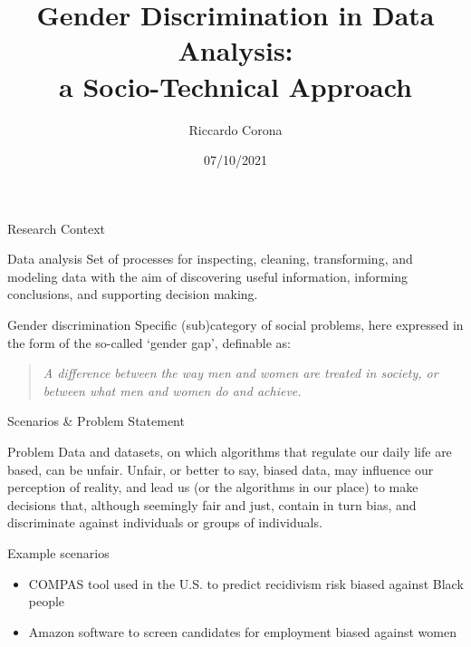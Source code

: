 \documentclass[usenames,dvipsnames]{beamer}
\title{Gender Discrimination in Data Analysis:\\a Socio-Technical Approach}
\author{Riccardo Corona}
\date{07/10/2021}
\begin{document}
    \begin{frame}
        \maketitle
    \end{frame}
    
    
    \begin{frame}{Research Context}
        \begin{block}{Data analysis}
            Set of processes for inspecting, cleaning, transforming, and modeling data with the aim of discovering useful information, informing conclusions, and supporting decision making.
        \end{block}
        \begin{block}{Gender discrimination}
            Specific (sub)category of social problems, here expressed in the form of the so-called `{gender gap}', definable as:
            \begin{quote}
            \emph{A difference between the way men and women are treated in society, or between what men and women do and achieve.} \parencite{cambridge2013gender}
            \end{quote}
        \end{block}
    \end{frame}
    
    
    \begin{frame}{Scenarios \& Problem Statement}
        \begin{block}{Problem}
            Data and datasets, on which algorithms that regulate our daily life are based, can be {unfair}. Unfair, or better to say, {biased} data, may influence our perception of reality, and lead us (or the algorithms in our place) to make decisions that, although seemingly fair and just, contain in turn bias, and discriminate against individuals or groups of individuals.
        \end{block}
        \begin{exampleblock}{Example scenarios}
            \begin{itemize}
                \item \textcolor{greenPolimi}{COMPAS} tool used in the U.S. to predict recidivism risk biased against Black people \emph{\parencite{angwin2016machine}}
                \item \textcolor{greenPolimi}{Amazon} software to screen candidates for employment biased against women \emph{\parencite{dastin2018amazon}}
            \end{itemize}
        \end{exampleblock}
    \end{frame}
    
\end{document}

